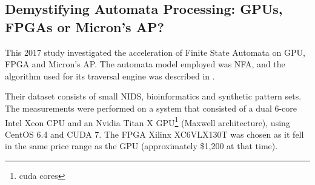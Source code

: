 \documentclass[10pt,onecolumn,twoside,english,a4paper]{article}
\begin{document}
\subsection{Demystifying Automata Processing: GPUs, FPGAs or Micron's AP?} \label{Nourian:DemystifyingFSA_analysis}
This 2017 study\cite{Nourian:DemystifyingFSA} investigated the acceleration of Finite State Automata on GPU, FPGA and Micron's AP. The automata model employed was NFA, and the algorithm used for its traversal engine was described in \cite{van2012designing}.

Their dataset consists of small NIDS, bioinformatics and synthetic pattern sets.
The measurements were performed on a system that consisted of a dual 6-core Intel Xeon CPU and an Nvidia Titan X GPU\footnote{cuda cores} (Maxwell architecture), using CentOS 6.4 and CUDA 7. The FPGA Xilinx XC6VLX130T was chosen as it fell in the same price range as the GPU (approximately \$1,200 at that time).
\end{document}

